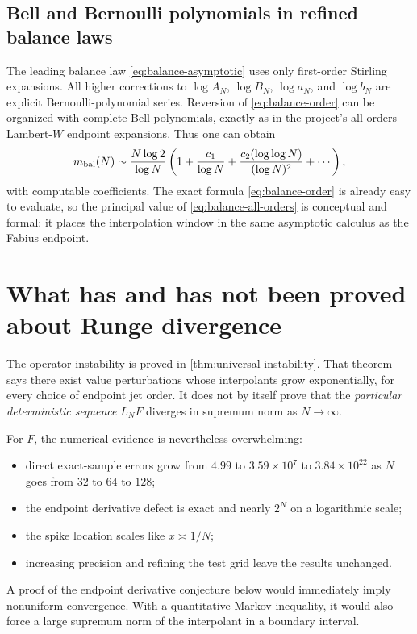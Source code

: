 \documentclass[11pt,oneside]{article}
\numberwithin{equation}{section}
\theoremstyle{definition}
\theoremstyle{remark}
\begin{document}
\subsection{Bell and Bernoulli polynomials in refined balance laws}

The leading balance law \eqref{eq:balance-asymptotic} uses only first-order Stirling
expansions.  All higher corrections to $\log A_N$, $\log B_N$, $\log a_N$, and
$\log b_N$ are explicit Bernoulli-polynomial series.  Reversion of
\eqref{eq:balance-order} can be organized with complete Bell polynomials, exactly as in the
project's all-orders Lambert-$W$ endpoint expansions.  Thus one can obtain
\begin{equation}
 m_{\rm bal}(N)
 \sim \frac{N\log2}{\log N}
 \left(1+\frac{c_1}{\log N}
 +\frac{c_2(\log\log N)}{(\log N)^2}+\cdots\right),
 \label{eq:balance-all-orders}
\end{equation}
with computable coefficients.  The exact formula \eqref{eq:balance-order} is already easy
to evaluate, so the principal value of \eqref{eq:balance-all-orders} is conceptual and
formal: it places the interpolation window in the same asymptotic calculus as the Fabius
endpoint.

\section{What has and has not been proved about Runge divergence}
\label{sec:runge-status}

The operator instability is proved in \cref{thm:universal-instability}.  That theorem says
there exist value perturbations whose interpolants grow exponentially, for every choice of
endpoint jet order.  It does not by itself prove that the \emph{particular deterministic
sequence} $L_NF$ diverges in supremum norm as $N\to\infty$.

For $F$, the numerical evidence is nevertheless overwhelming:
\begin{itemize}
\item direct exact-sample errors grow from $4.99$ to $3.59\times10^7$ to
      $3.84\times10^{22}$ as $N$ goes from $32$ to $64$ to $128$;
\item the endpoint derivative defect is exact and nearly $2^N$ on a logarithmic scale;
\item the spike location scales like $x\asymp1/N$;
\item increasing precision and refining the test grid leave the results unchanged.
\end{itemize}
A proof of the endpoint derivative conjecture below would immediately imply nonuniform
convergence.  With a quantitative Markov inequality, it would also force a large supremum
norm of the interpolant in a boundary interval.
\end{document}
